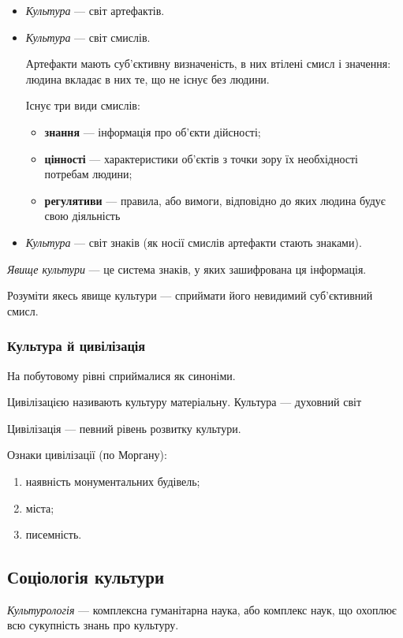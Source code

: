 \documentclass[a5paper,10pt,titlepage,pdftex,headsepline]{scrartcl}
\begin{document}
\begin{itemize}
  \item \textit{Культура} --- світ артефактів.
  \item \textit{Культура} --- світ смислів.

    Артефакти мають суб’єктивну визначеність, в них втілені смисл і значення: людина вкладає в них те, що не існує без людини.

    Існує три види смислів:
    \begin{itemize}
      \item \textbf{знання} --- інформація про об’єкти дійсності;
      \item \textbf{цінності} --- характеристики об’єктів з точки зору їх необхідності потребам людини;
      \item \textbf{регулятиви} --- правила, або вимоги, відповідно до яких людина будує свою діяльність
    \end{itemize}
  \item \textit{Культура} --- світ знаків (як носії смислів артефакти стають знаками).
\end{itemize}

\textit{Явище культури} --- це система знаків, у яких зашифрована ця інформація.

Розуміти якесь явище культури --- сприймати його невидимий суб’єктивний смисл.

\subsubsection{Культура й цивілізація}
На побутовому рівні сприймалися як синоніми.

Цивілізацією називають культуру матеріальну. Культура --- духовний світ

Цивілізація --- певний рівень розвитку культури.

Ознаки цивілізації (по Моргану):
\begin{enumerate}
  \item наявність монументальних будівель;
  \item міста;
  \item писемність.
\end{enumerate}

\subsection{Соціологія культури}
\textit{Культурологія} --- комплексна гуманітарна наука, або комплекс наук, що охоплює всю сукупність знань про культуру.
\end{document}
